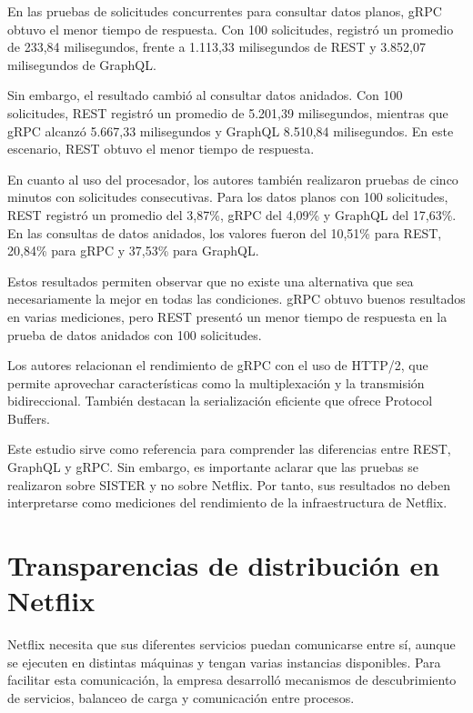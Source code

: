 En las pruebas de solicitudes concurrentes para consultar datos planos, gRPC obtuvo el menor tiempo de respuesta. Con 100 solicitudes, registró un promedio de 233,84 milisegundos, frente a 1.113,33 milisegundos de REST y 3.852,07 milisegundos de GraphQL.

Sin embargo, el resultado cambió al consultar datos anidados. Con 100 solicitudes, REST registró un promedio de 5.201,39 milisegundos, mientras que gRPC alcanzó 5.667,33 milisegundos y GraphQL 8.510,84 milisegundos. En este escenario, REST obtuvo el menor tiempo de respuesta.

En cuanto al uso del procesador, los autores también realizaron pruebas de cinco minutos con solicitudes consecutivas. Para los datos planos con 100 solicitudes, REST registró un promedio del 3,87\%, gRPC del 4,09\% y GraphQL del 17,63\%. En las consultas de datos anidados, los valores fueron del 10,51\% para REST, 20,84\% para gRPC y 37,53\% para GraphQL.

Estos resultados permiten observar que no existe una alternativa que sea necesariamente la mejor en todas las condiciones. gRPC obtuvo buenos resultados en varias mediciones, pero REST presentó un menor tiempo de respuesta en la prueba de datos anidados con 100 solicitudes.

Los autores relacionan el rendimiento de gRPC con el uso de HTTP/2, que permite aprovechar características como la multiplexación y la transmisión bidireccional. También destacan la serialización eficiente que ofrece Protocol Buffers.

Este estudio sirve como referencia para comprender las diferencias entre REST, GraphQL y gRPC. Sin embargo, es importante aclarar que las pruebas se realizaron sobre SISTER y no sobre Netflix. Por tanto, sus resultados no deben interpretarse como mediciones del rendimiento de la infraestructura de Netflix.

\parencite{niswar2024grpc}


\section{Transparencias de distribución en Netflix}

Netflix necesita que sus diferentes servicios puedan comunicarse entre sí, aunque se ejecuten en distintas máquinas y tengan varias instancias disponibles. Para facilitar esta comunicación, la empresa desarrolló mecanismos de descubrimiento de servicios, balanceo de carga y comunicación entre procesos.

